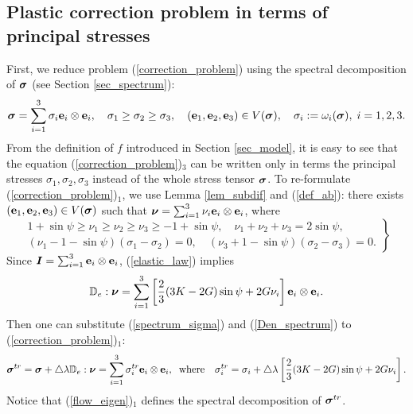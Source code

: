 \documentclass[a4paper,12pt]{article}
\theoremstyle{remark}
\newcommand{\mbf}[1]{\mbox{\boldmath$#1$}}
\numberwithin{equation}{section}
\begin{document}
\subsection{Plastic correction problem in terms of principal stresses}
\label{subsec_corrections}

First, we reduce problem (\ref{correction_problem}) using the spectral decomposition of $\mbf \sigma$ (see Section \ref{sec_spectrum}):
\begin{equation}
\mbf\sigma=\sum_{i=1}^3\sigma_i\mathbf e_i\otimes\mathbf e_i,\quad \sigma_1\geq\sigma_2\geq\sigma_3,\quad (\mathbf e_1, \mathbf e_2, \mathbf e_3)\in V(\mbf\sigma), \quad \sigma_i:=\omega_i(\mbf\sigma),\;i=1,2,3.
\label{spectrum_sigma}
\end{equation}
From the definition of $f$ introduced in Section \ref{sec_model}, it is easy to see that the equation (\ref{correction_problem})$_3$ can be written only in terms the principal stresses $\sigma_1,\sigma_2,\sigma_3$ instead of the whole stress tensor $\mbf\sigma$. To re-formulate (\ref{correction_problem})$_1$, we use Lemma \ref{lem_subdif} and (\ref{def_ab}): there exists $(\mathbf e_1, \mathbf e_2, \mathbf e_3)\in V(\mbf\sigma)$ such that $\mbf\nu=\sum_{i=1}^3 \nu_i\mathbf e_i\otimes\mathbf e_i$, where
\begin{equation}
\left.
\begin{array}{c}
1+\sin\psi\geq \nu_1\geq \nu_2\geq \nu_3\geq-1+\sin\psi, \quad \nu_1+ \nu_2+ \nu_3=2\sin\psi,\\[1 mm]
( \nu_1-1-\sin\psi)(\sigma_1-\sigma_2)=0,\quad ( \nu_3+1-\sin\psi)(\sigma_2-\sigma_3)=0.
\end{array}
\right\}
\label{prop_n_i}
\end{equation}
Since $\mbf I=\sum_{i=1}^3\mathbf e_i\otimes\mathbf e_i$, (\ref{elastic_law}) implies
\begin{equation}
\mathbb D_e:\mbf\nu=\sum_{i=1}^3 \left[\frac{2}{3}(3K-2G)\sin\psi+2G\nu_i\right]\mathbf e_i\otimes\mathbf e_i.
\label{Den_spectrum}
\end{equation}
Then one can substitute (\ref{spectrum_sigma}) and (\ref{Den_spectrum}) to (\ref{correction_problem})$_1$:
\begin{equation}
\mbf{\sigma}^{tr}=\mbf\sigma+\triangle\lambda\mathbb D_e:\mbf\nu=\sum_{i=1}^3\sigma_i^{tr}\mathbf e_i\otimes\mathbf e_i,\;\;\mbox{where}\quad \sigma_i^{tr}=\sigma_i+\triangle\lambda\left[\frac{2}{3}(3K-2G)\sin\psi+2G\nu_i\right].
\label{flow_eigen}
\end{equation}
Notice that (\ref{flow_eigen})$_1$ defines the spectral decomposition of $\mbf\sigma^{tr}$.
\end{document}
